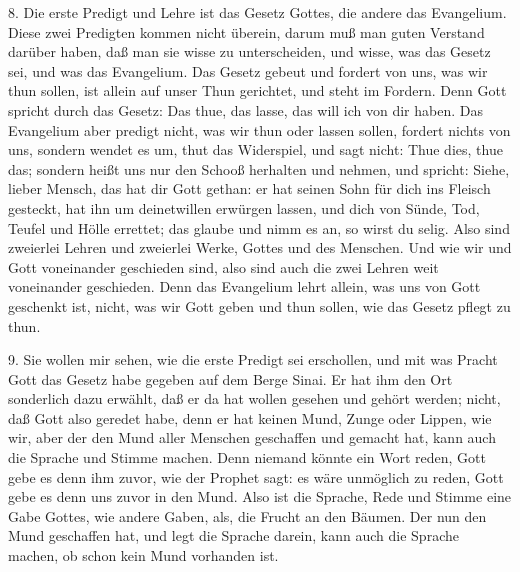8. Die erste Predigt und Lehre ist das Gesetz Gottes, die andere das Evangelium. Diese zwei Predigten kommen nicht überein, darum muß man guten Verstand darüber haben, daß man sie wisse zu unterscheiden, und wisse, was das Gesetz sei, und was das Evangelium. Das Gesetz gebeut und fordert von uns, was wir thun sollen, ist allein auf unser Thun gerichtet, und steht im Fordern. Denn Gott spricht durch das Gesetz: Das thue, das lasse, das will ich von dir haben. Das Evangelium aber predigt nicht, was wir thun oder lassen sollen, fordert nichts von uns, sondern wendet es um, thut das Widerspiel, und sagt nicht: Thue dies, thue das; sondern heißt uns nur den Schooß herhalten und nehmen, und spricht: Siehe, lieber Mensch,
das hat dir Gott gethan: er hat seinen Sohn für dich ins Fleisch gesteckt, hat ihn um deinetwillen erwürgen lassen, und dich von Sünde, Tod, Teufel und Hölle errettet; das glaube und nimm es an, so wirst du selig. Also sind zweierlei Lehren und zweierlei Werke, Gottes und des Menschen. Und wie wir und Gott voneinander geschieden sind, also sind auch die zwei Lehren weit voneinander geschieden. Denn das Evangelium lehrt allein, was uns von Gott geschenkt ist, nicht, was wir Gott geben und thun sollen, wie das Gesetz pflegt zu thun.

9. Sie wollen mir sehen, wie die erste Predigt sei erschollen, und mit was Pracht Gott das Gesetz habe gegeben auf dem Berge Sinai. Er hat ihm den Ort sonderlich dazu erwählt, daß er da hat wollen gesehen und gehört werden; nicht, daß Gott also geredet habe, denn er hat keinen Mund, Zunge oder Lippen, wie wir, aber der den Mund aller Menschen geschaffen und gemacht hat, kann auch die Sprache und Stimme machen. Denn niemand könnte ein Wort reden, Gott gebe es denn ihm zuvor, wie der Prophet sagt: es wäre unmöglich zu reden, Gott gebe es denn uns zuvor in den Mund. Also ist die Sprache, Rede und Stimme eine Gabe Gottes, wie andere Gaben, als, die Frucht an den Bäumen. Der nun den Mund geschaffen hat, und legt die Sprache darein, kann auch die Sprache machen, ob schon kein Mund vorhanden ist.

